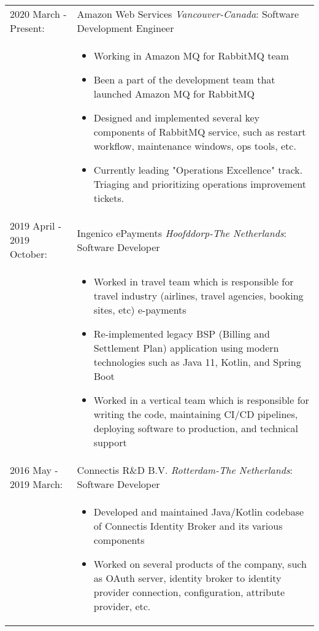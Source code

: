 \documentclass[11pt]{article}
\begin{document}
\begin{tabular}{p{5.5cm} p{12.5cm}}
\\
2020 March - Present:   & Amazon Web Services \textit{Vancouver-Canada}: Software Development Engineer \\
							 &
\begin{itemize}
\setlength\itemsep{0em}
\vspace{-15pt}
\item Working in Amazon MQ for RabbitMQ team
\item Been a part of the development team that launched Amazon MQ for RabbitMQ
\item Designed and implemented several key components of RabbitMQ service, such as restart workflow, maintenance windows, ops tools, etc.
\item Currently leading "Operations Excellence" track. Triaging and prioritizing operations improvement tickets.
\vspace{-10pt}
\end{itemize}\\
2019 April - 2019 October:   & Ingenico ePayments \textit{Hoofddorp-The Netherlands}: Software Developer \\
							 &
\begin{itemize}
\setlength\itemsep{0em}
\vspace{-15pt}
\item Worked in travel team which is responsible for travel industry (airlines, travel agencies, booking sites, etc) e-payments
\item Re-implemented legacy BSP (Billing and Settlement Plan) application using modern technologies such as Java 11, Kotlin, and Spring Boot
\item Worked in a vertical team which is responsible for writing the code, maintaining CI/CD pipelines, deploying software to production, and technical support
\vspace{-10pt}
\end{itemize}\\
2016 May - 2019 March:       & Connectis R\&D B.V. \textit{Rotterdam-The Netherlands}: Software Developer \\
							 &
\begin{itemize}
\setlength\itemsep{0em}
\vspace{-15pt}
\item Developed and maintained Java/Kotlin codebase of Connectis Identity Broker and its various components
\item Worked on several products of the company, such as OAuth server, identity broker to identity provider connection, configuration, attribute provider, etc.

\end{itemize}
\end{tabular}
\end{document}
